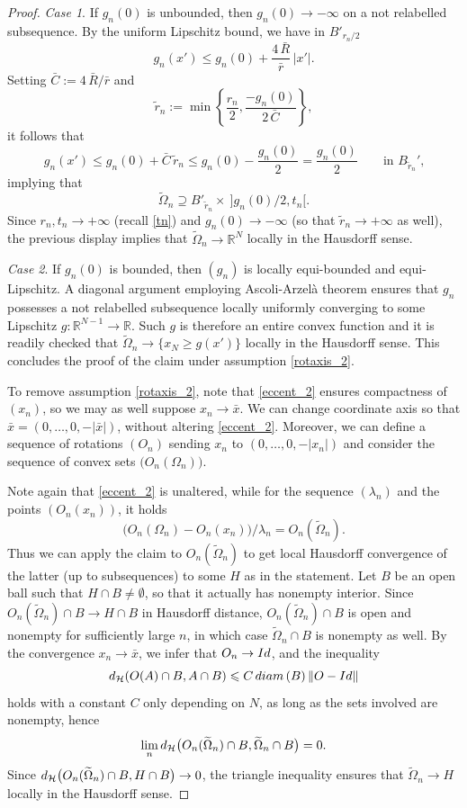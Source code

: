 \documentclass[12pt]{amsart}
\numberwithin{equation}{section}
\theoremstyle{plain}
\theoremstyle{plain}
\theoremstyle{plain}
\theoremstyle{definition}
\newcommand{\R}{{\mathbb R}}
\renewcommand{\le}{\leqslant}
\renewcommand{\ge}{\geqslant}
\newcommand{\cal}{\mathcal}
\begin{document}
\begin{proof}
\emph{Case 1}. 
 If $g_n(0)$ is unbounded, then $g_n(0)\to -\infty$ on a not relabelled subsequence. 
By the uniform Lipschitz bound, we have in $B'_{r_n/2}$
 \[
 g_n(x')\le g_n(0)+ \frac{4\, \bar R}{\bar r}\,|x'|.
 \]
Setting $\bar C:=4\, \bar R/\bar r$ and
\[
\tilde{r}_n:=\min\left\{\frac{r_n}{2}, \frac{-g_n(0)}{2\, \bar C}\right\},
\] 
 it follows that 
\[
g_n(x')\le g_n(0) +\bar C\, \tilde{r}_n\le g_n(0)-\frac{g_n(0)}{2}=\frac{g_n(0)}{2}\qquad \text{in $B_{\tilde{r}_n}'$,}
\]
implying that 
 \[
 \widetilde{\Omega}_n\supseteq B'_{\tilde{r}_n}\times\ ]g_n(0)/2, t_n[.
 \]
Since $r_n, t_n\to +\infty$ (recall \eqref{tn}) and $g_n(0)\to -\infty$ (so that $\tilde{r}_n\to +\infty$ as well), the previous display implies that $\widetilde{\Omega}_n\to \R^N$ locally in the Hausdorff sense. 

\emph{Case 2}.
If $g_n(0)$ is bounded, then $(g_n)$ is locally equi-bounded and equi-Lipschitz. 
A diagonal argument employing Ascoli-Arzelà theorem ensures that $g_n$ possesses a not relabelled subsequence locally uniformly converging to some Lipschitz $g:\R^{N-1}\to \R$. Such $g$ is therefore an entire convex function and it is readily checked that $\widetilde{\Omega}_n\to \{x_N\ge g(x')\}$ locally in the Hausdorff sense.
This concludes the proof of the claim under assumption \eqref{rotaxis_2}.

\smallskip
To remove assumption \eqref{rotaxis_2}, note that \eqref{eccent_2} ensures compactness of $(x_n)$, so we may as well suppose $x_n\to \bar x$. We can change coordinate axis so that $\bar x=(0, \dots, 0, -|\bar x|)$, without altering \eqref{eccent_2}. 
Moreover, we can define a sequence of rotations $(O_n)$ sending $x_n$ to $(0, \dots, 0, -|x_n|)$ and consider the sequence of convex sets $\big(O_n(\Omega_n)\big)$.

Note again that \eqref{eccent_2} is unaltered, while for the sequence $(\lambda_n)$ and the points $(O_n(x_n))$, it holds 
\[
\big(O_n(\Omega_n)-O_n(x_n)\big)/\lambda_n=O_n(\widetilde{\Omega}_n).
\]
Thus we can apply the claim to $O_n(\widetilde{\Omega}_n)$ to get local Hausdorff convergence of the latter (up to subsequences) to some $H$ as in the statement. 
Let $B$ be an open ball such that $H\cap B\ne \emptyset$, so that it actually has nonempty interior. 
Since $O_n(\widetilde{\Omega}_n)\cap B\to H\cap B$ in Hausdorff distance, $O_n(\widetilde{\Omega}_n)\cap B$ is open and nonempty for sufficiently large $n$, in which case $\widetilde{\Omega}_n\cap B$ is nonempty as well. 
By the convergence $x_n\to \bar x$, we infer that $O_n\to {\rm Id}$, and the inequality
\[
{\rm d}_{\cal H}(O(A)\cap B, A\cap B)\le C\, {\rm diam}\, (B)\, \|O -{\rm Id}\|
\]
holds with a constant $C$ only depending on $N$, as long as the sets involved are nonempty, hence 
\[
\lim_n{\rm d}_{\cal H}\big(O_n(\widetilde{\Omega}_n)\cap B, \widetilde{\Omega}_n\cap B\big)=0.
\]
Since ${\rm d}_{\cal H}\big(O_n(\widetilde{\Omega}_n)\cap B, H\cap B\big) \to 0$, the triangle inequality ensures that $\widetilde{\Omega}_n\to H$ locally in the Hausdorff sense.
\end{proof}
\end{document}
